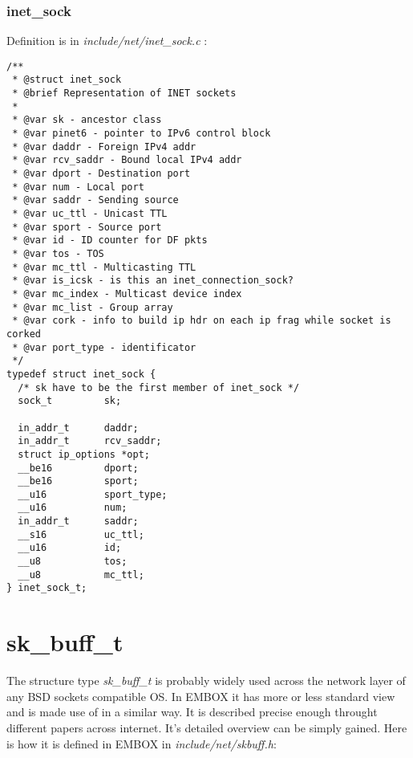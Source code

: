 \documentclass[12pt,a4paper]{article}
\begin{document}
\subsubsection{inet\_sock}
\label{sec:af_inet_inet_sock}
Definition is in {\it include/net/inet\_sock.c} :
\begin{verbatim}
/**
 * @struct inet_sock
 * @brief Representation of INET sockets
 *
 * @var sk - ancestor class
 * @var pinet6 - pointer to IPv6 control block
 * @var daddr - Foreign IPv4 addr
 * @var rcv_saddr - Bound local IPv4 addr
 * @var dport - Destination port
 * @var num - Local port
 * @var saddr - Sending source
 * @var uc_ttl - Unicast TTL
 * @var sport - Source port
 * @var id - ID counter for DF pkts
 * @var tos - TOS
 * @var mc_ttl - Multicasting TTL
 * @var is_icsk - is this an inet_connection_sock?
 * @var mc_index - Multicast device index
 * @var mc_list - Group array
 * @var cork - info to build ip hdr on each ip frag while socket is corked
 * @var port_type - identificator
 */
typedef struct inet_sock {
  /* sk have to be the first member of inet_sock */
  sock_t         sk;

  in_addr_t      daddr;
  in_addr_t      rcv_saddr;
  struct ip_options *opt;
  __be16         dport;
  __be16         sport;
  __u16          sport_type;
  __u16          num;
  in_addr_t      saddr;
  __s16          uc_ttl;
  __u16          id;
  __u8           tos;
  __u8           mc_ttl;
} inet_sock_t;
\end{verbatim}

\newpage
\section{sk\_buff\_t}
\label{sec:sk_buff_t}
The structure type {\it sk\_buff\_t} is probably widely used across the network
layer of any BSD sockets compatible OS. In EMBOX it has more or less standard
view and is made use of in a similar way. It is described precise enough throught
different papers across internet. It's detailed overview can be simply gained.
Here is how it is defined in EMBOX in {\it include/net/skbuff.h}:
\end{document}
